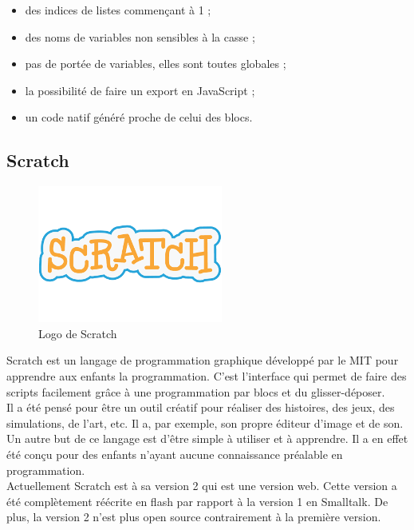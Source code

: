 \begin{itemize}
  \item des indices de listes commençant à 1 ;
  \item des noms de variables non sensibles à la casse ;
  \item pas de portée de variables, elles sont toutes globales ;
  \item la possibilité de faire un export en JavaScript ;
  \item un code natif généré proche de celui des \glspl{bloc}.
\end{itemize}

\subsection{Scratch}

\begin{figure}[!ht]
  \begin{center}
    \includegraphics[scale=0.4]{content/5-related_work/images/scratch}
    \caption{Logo de Scratch}
    \label{fig:scratch}
  \end{center}
\end{figure}
Scratch \cite{scratch} est un langage de programmation graphique développé par le MIT pour apprendre aux enfants la programmation. C'est l'interface qui permet de faire des \glspl{script} facilement grâce à une programmation par \glspl{bloc} et du glisser-déposer.\\

Il a été pensé pour être un outil créatif pour réaliser des histoires, des jeux, des simulations, de l'art, etc. Il a, par exemple, son propre éditeur d'image et de son. Un autre but de ce langage est d'être simple à utiliser et à apprendre. Il a en effet été conçu pour des enfants n'ayant aucune connaissance préalable en programmation.\\

Actuellement Scratch est à sa version 2 qui est une version web. Cette version a été complètement réécrite en flash par rapport à la version 1 en Smalltalk. De plus, la version 2 n'est plus open source contrairement à la première version.

